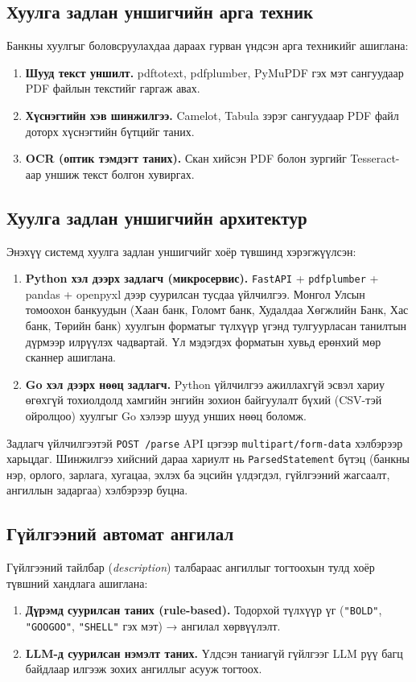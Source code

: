 \subsection{Хуулга задлан уншигчийн арга техник}
Банкны хуулгыг боловсруулахдаа дараах гурван үндсэн арга техникийг ашиглана:
\begin{enumerate}
    \item \textbf{Шууд текст уншилт.} pdftotext, pdfplumber, PyMuPDF гэх мэт сангуудаар PDF файлын текстийг гаргаж авах.
    \item \textbf{Хүснэгтийн хэв шинжилгээ.} Camelot, Tabula зэрэг сангуудаар PDF файл доторх хүснэгтийн бүтцийг таних.
    \item \textbf{OCR (оптик тэмдэгт таних).} Скан хийсэн PDF болон зургийг Tesseract-аар уншиж текст болгон хувиргах.
\end{enumerate}

\subsection{Хуулга задлан уншигчийн архитектур}
Энэхүү системд хуулга задлан уншигчийг хоёр түвшинд хэрэгжүүлсэн:
\begin{enumerate}
    \item \textbf{Python хэл дээрх задлагч (микросервис).} \texttt{FastAPI} \cite{fastapi} + \texttt{pdfplumber} \cite{pdfplumber} + pandas + openpyxl дээр суурилсан тусдаа үйлчилгээ. Монгол Улсын томоохон банкуудын (Хаан банк, Голомт банк, Худалдаа Хөгжлийн Банк, Хас банк, Төрийн банк) хуулгын форматыг түлхүүр үгэнд тулгуурласан танилтын дүрмээр илрүүлэх чадвартай. Үл мэдэгдэх форматын хувьд ерөнхий мөр сканнер ашиглана.
    \item \textbf{Go хэл дээрх нөөц задлагч.} Python үйлчилгээ ажиллахгүй эсвэл хариу өгөхгүй тохиолдолд хамгийн энгийн зохион байгуулалт бүхий (CSV-тэй ойролцоо) хуулгыг Go хэлээр шууд унших нөөц боломж.
\end{enumerate}
Задлагч үйлчилгээтэй \texttt{POST /parse} API цэгээр \texttt{multipart/form-data} хэлбэрээр харьцдаг. Шинжилгээ хийсний дараа хариулт нь \texttt{ParsedStatement} бүтэц (банкны нэр, орлого, зарлага, хугацаа, эхлэх ба эцсийн үлдэгдэл, гүйлгээний жагсаалт, ангиллын задаргаа) хэлбэрээр буцна.

\subsection{Гүйлгээний автомат ангилал}
Гүйлгээний тайлбар (\textit{description}) талбараас ангиллыг тогтоохын тулд хоёр түвшний хандлага ашиглана:
\begin{enumerate}
    \item \textbf{Дүрэмд суурилсан таних (rule-based).} Тодорхой түлхүүр үг (\texttt{"BOLD"}, \texttt{"GOOGOO"}, \texttt{"SHELL"} гэх мэт) → ангилал хөрвүүлэлт.
    \item \textbf{LLM-д суурилсан нэмэлт таних.} Үлдсэн таниагүй гүйлгээг LLM рүү багц байдлаар илгээж зохих ангиллыг асууж тогтоох.
\end{enumerate}

